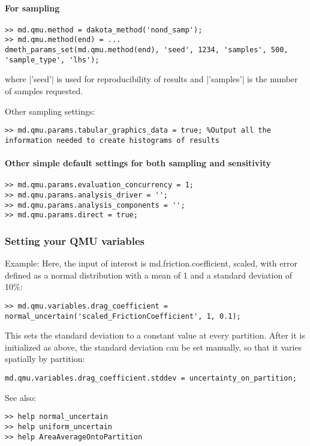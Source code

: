 \paragraph{For sampling}
\begin{lstlisting}
>> md.qmu.method = dakota_method('nond_samp');
>> md.qmu.method(end) = ...
dmeth_params_set(md.qmu.method(end), 'seed', 1234, 'samples', 500, 'sample_type', 'lhs');
\end{lstlisting}
where \lstinlinebg|'seed'| is used for reproducibility of results and \lstinlinebg|'samples'| is the number of samples requested.

Other sampling settings:
\begin{lstlisting}
>> md.qmu.params.tabular_graphics_data = true; %Output all the information needed to create histograms of results
\end{lstlisting}

\paragraph{Other simple default settings for both sampling and sensitivity}
\begin{lstlisting}
>> md.qmu.params.evaluation_concurrency = 1;
>> md.qmu.params.analysis_driver = '';
>> md.qmu.params.analysis_components = '';
>> md.qmu.params.direct = true;
\end{lstlisting}

\subsubsection{Setting your QMU variables}
Example: Here, the input of interest is md.friction.coefficient, scaled, with error defined as a normal distribution with a mean of 1 and a standard deviation of 10\%:
\begin{lstlisting}
>> md.qmu.variables.drag_coefficient = normal_uncertain('scaled_FrictionCoefficient', 1, 0.1);
\end{lstlisting}

This sets the standard deviation to a constant value at every partition. After it is initialized as above, the standard deviation can be set manually, so that it varies spatially by partition:
\begin{lstlisting}
md.qmu.variables.drag_coefficient.stddev = uncertainty_on_partition;
\end{lstlisting}

See also:
\begin{lstlisting}
>> help normal_uncertain
>> help uniform_uncertain
>> help AreaAverageOntoPartition
\end{lstlisting}

